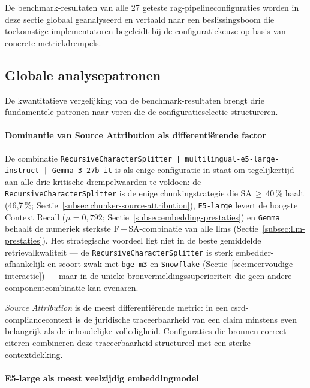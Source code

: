 De benchmark-resultaten van alle 27 geteste \gls{rag}-pipelineconfiguraties worden in deze sectie globaal geanalyseerd en vertaald naar een beslissingsboom die toekomstige implementatoren begeleidt bij de configuratiekeuze op basis van concrete metriekdrempels.

\subsection{Globale analysepatronen}
\label{subsec:globale-analysepatronen}

De kwantitatieve vergelijking van de benchmark-resultaten brengt drie fundamentele patronen naar voren die de configuratieselectie structureren.

\paragraph{Dominantie van Source Attribution als differentiërende factor}

De combinatie \texttt{RecursiveCharacterSplitter | multilingual-e5-large-instruct | Gemma-3-27b-it} is als enige configuratie in staat om tegelijkertijd aan alle drie kritische drempelwaarden te voldoen: de \texttt{RecursiveCharacterSplitter} is de enige chunkingstrategie die SA\,$\geq$\,40\,\% haalt (46{,}7\,\%; Sectie~\ref{subsec:chunker-source-attribution}), \texttt{E5-large} levert de hoogste Context Recall ($\mu = 0{,}792$; Sectie~\ref{subsec:embedding-prestaties}) en \texttt{Gemma} behaalt de numeriek sterkste F\,+\,SA-combinatie van alle \glspl{llm} (Sectie~\ref{subsec:llm-prestaties}). Het strategische voordeel ligt niet in de beste gemiddelde retrievalkwaliteit — de \texttt{RecursiveCharacterSplitter} is sterk embedder-afhankelijk en scoort zwak met \texttt{bge-m3} en \texttt{Snowflake} (Sectie~\ref{sec:meervoudige-interactie}) — maar in de unieke bronvermeldingssuperioriteit die geen andere componentcombinatie kan evenaren.

\textit{Source Attribution} is de meest differentiërende metric: in een \gls{csrd}-compliancecontext is de juridische traceerbaarheid van een claim minstens even belangrijk als de inhoudelijke volledigheid. Configuraties die bronnen correct citeren combineren deze traceerbaarheid structureel met een sterke contextdekking.

\paragraph{E5-large als meest veelzijdig embeddingmodel}

